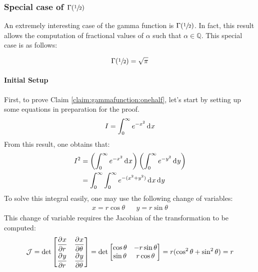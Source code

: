 \documentclass[12pt]{article}
\newcommand{\J}{\mathcal{J}}
\begin{document}
\pagebreak
\subsubsection{Special case of $\Gamma(\sfrac{1}{2})$ }
An extremely interesting case of the gamma function is $\Gamma(\sfrac{1}{2})$. In fact, this result allows the
computation of fractional values of $\alpha$ such that $\alpha\in\mathbb{Q}$. This special case is as follows:
\begin{claim}\label{claim:gammafunction:onehalf}
	\begin{equation*}
		\Gamma(\sfrac{1}{2})=\sqrt{\pi}
	\end{equation*}
\end{claim}

\paragraph{Initial Setup}
First, to prove Claim \ref{claim:gammafunction:onehalf}, let's start by setting up some equations in preparation for the
proof.
\begin{equation}\label{eq:gammafunction:i}
	I = \int^\infty_0 e^{-x^2}\mathop{}\!\mathrm{d^{}}x
\end{equation}
From this result, one obtains that:
\begin{equation}\label{eq:gammafunction:isquared}
	\begin{split}
		I^2	&=	\left(\int^\infty_0 e^{-x^2}\mathop{}\!\mathrm{d^{}}x\right)\left(\int^\infty_0 e^{-y^2}\mathop{}\!\mathrm{d^{}}y\right)\\
			&=	\int^\infty_0\int^\infty_0 e^{-(x^2+y^2)}\mathop{}\!\mathrm{d^{}}x\mathop{}\!\mathrm{d^{}}y
	\end{split}
\end{equation}
To solve this integral easily, one may use the following change of variables:
\begin{align*}
	x=r\cos\theta	&&	y=r\sin\theta
\end{align*}
This change of variable requires the Jacobian of the transformation to be computed:
\begin{equation}\label{eq:gammafunction:jacobian}
	\J = \det\begin{bmatrix}
		\pderiv{x}{r}	&	\pderiv{x}{\theta}\\[6pt]
		\pderiv{y}{r}	&	\pderiv{y}{\theta}
		\end{bmatrix} = \det\begin{bmatrix}
			\cos\theta	&	-r\sin\theta\\
			\sin\theta	&	r\cos\theta
		\end{bmatrix} = r(\cos^2\theta + \sin^2\theta) = r
\end{equation}
\end{document}
